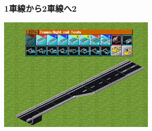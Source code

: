 \documentclass{jarticle}
\begin{document}
\subsubsection{1車線から2車線へ2}
\label{sub:1lane_to_2lane2}

\includegraphics[width = 75mm]{picture/20210214-road-5-5.png}

\vspace{10pt}
\end{document}
